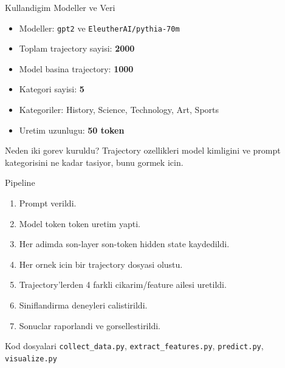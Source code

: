 \documentclass[aspectratio=169]{beamer}
\begin{document}
\begin{frame}{Kullandigim Modeller ve Veri}
  \begin{itemize}
    \item Modeller: \texttt{gpt2} ve \texttt{EleutherAI/pythia-70m}
    \item Toplam trajectory sayisi: \textbf{2000}
    \item Model basina trajectory: \textbf{1000}
    \item Kategori sayisi: \textbf{5}
    \item Kategoriler: History, Science, Technology, Art, Sports
    \item Uretim uzunlugu: \textbf{50 token}
  \end{itemize}

  \vspace{0.5em}
  \begin{block}{Neden iki gorev kuruldu?}
    Trajectory ozellikleri model kimligini ve prompt kategorisini ne kadar tasiyor, bunu gormek icin.
  \end{block}
\end{frame}

\begin{frame}{Pipeline}
  \begin{enumerate}
    \item Prompt verildi.
    \item Model token token uretim yapti.
    \item Her adimda son-layer son-token hidden state kaydedildi.
    \item Her ornek icin bir trajectory dosyasi olustu.
    \item Trajectory'lerden 4 farkli cikarim/feature ailesi uretildi.
    \item Siniflandirma deneyleri calistirildi.
    \item Sonuclar raporlandi ve gorsellestirildi.
  \end{enumerate}

  \vspace{0.4em}
  \begin{block}{Kod dosyalari}
    \texttt{collect\_data.py}, \texttt{extract\_features.py}, \texttt{predict.py}, \texttt{visualize.py}
  \end{block}
\end{frame}
\end{document}
